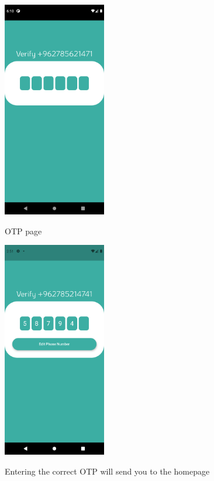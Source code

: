 \documentclass[12pt]{article}
\begin{document}
\begin{figure}[h!]
{\includegraphics[width=0.4\textwidth]{./Screenshots/8.PNG}}
  \caption{OTP page}
  \end{figure}
  
  
\begin{figure}[h!]
{\includegraphics[width=0.4\textwidth]{./Screenshots/OTP.PNG}}
  \caption{Entering the correct OTP will send you to the homepage}
  \end{figure}
\end{document}
